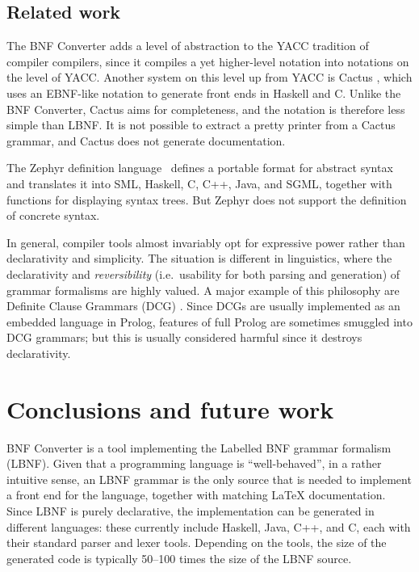 \documentclass{llncs}
\begin{document}


\subsection{Related work}

The BNF Converter adds a level of abstraction to the YACC \cite{johnson-yacc} 
tradition of compiler compilers,
since it compiles a yet higher-level notation into
notations on the level of YACC.
Another system on this 
level up from YACC is Cactus \cite{Cactus},
which uses an EBNF-like notation to 
generate front ends in Haskell and C.
Unlike the BNF Converter, Cactus aims for completeness,
and the notation is therefore less simple than LBNF. 
It is not possible to extract a pretty printer from a Cactus grammar, 
and Cactus does not generate documentation.

The Zephyr definition language 
\cite{zephyr}\ defines a portable format for abstract syntax
and translates it into SML, Haskell, C, C++,
Java, and SGML, together with functions for displaying syntax trees.
But Zephyr does not support the definition of concrete syntax.

In general, compiler tools almost invariably opt for expressive power 
rather than declarativity and simplicity.
The situation is different in linguistics, where
the declarativity and \textit{reversibility} (i.e.\ usability for both
parsing and generation) of grammar formalisms are highly valued. A major 
example of this philosophy are Definite Clause Grammars (DCG) 
\cite{dcg}. Since DCGs are usually implemented as an embedded 
language in Prolog, 
features of full Prolog are sometimes smuggled into DCG grammars;
but this is usually considered harmful since it destroys
declarativity.



\section{Conclusions and future work}

BNF Converter is a tool implementing the Labelled BNF grammar formalism
(LBNF). Given that a programming language is
``well-behaved'', in a rather intuitive sense, an
LBNF grammar is the only source that is needed to implement
a front end for the language, together with matching
LaTeX documentation. Since LBNF is purely declarative, 
the implementation can be generated in different languages:
these currently include Haskell, Java, C++, and C, each with
their standard parser and lexer tools. Depending on
the tools, the size of the generated code is typically 
50--100 times the size of the LBNF source.
\end{document}
